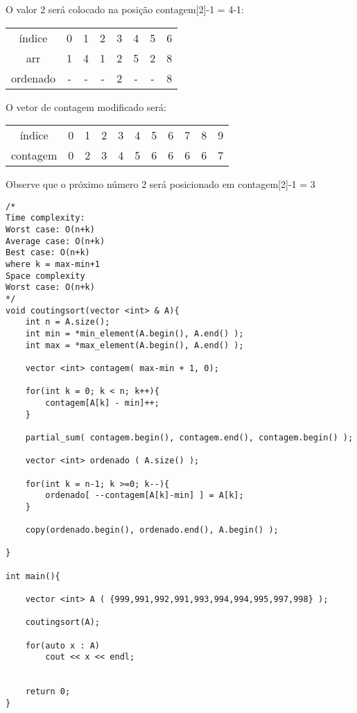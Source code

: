 \begin{exemplo}
\begin{enumerate}
O valor 2 será colocado na posição contagem[2]-1 = 4-1:

\begin{tabular}{cccccccc}
índice   & 0  & 1 & 2 & 3 & 4 & 5 & 6\\
arr      &  1 & 4 & 1 & 2 & 5 & 2 & 8\\
ordenado &  - & - & - & 2 & - & - & 8\\ 
\end{tabular}


O vetor de contagem modificado será:

\begin{tabular}{ccccccccccc}
índice     &  0 & 1 & 2 & 3 & 4 & 5 & 6 & 7 & 8 & 9\\
contagem   &  0 & 2 & 3 & 4 & 5 & 6 & 6 & 6 & 6 & 7\\
\end{tabular}

Observe que o próximo número 2 será posicionado em contagem[2]-1 = 3



\end{enumerate}


\end{exemplo}


\begin{verbatim}
/*
Time complexity:
Worst case: O(n+k)
Average case: O(n+k)
Best case: O(n+k)
where k = max-min+1
Space complexity
Worst case: O(n+k)
*/
void coutingsort(vector <int> & A){
    int n = A.size();
    int min = *min_element(A.begin(), A.end() );
    int max = *max_element(A.begin(), A.end() );

    vector <int> contagem( max-min + 1, 0);

    for(int k = 0; k < n; k++){
        contagem[A[k] - min]++;
    }

    partial_sum( contagem.begin(), contagem.end(), contagem.begin() );

    vector <int> ordenado ( A.size() );

    for(int k = n-1; k >=0; k--){
        ordenado[ --contagem[A[k]-min] ] = A[k];
    }

    copy(ordenado.begin(), ordenado.end(), A.begin() );

}

int main(){

    vector <int> A ( {999,991,992,991,993,994,994,995,997,998} );

    coutingsort(A);

    for(auto x : A)
        cout << x << endl;


    return 0;
}
\end{verbatim}


